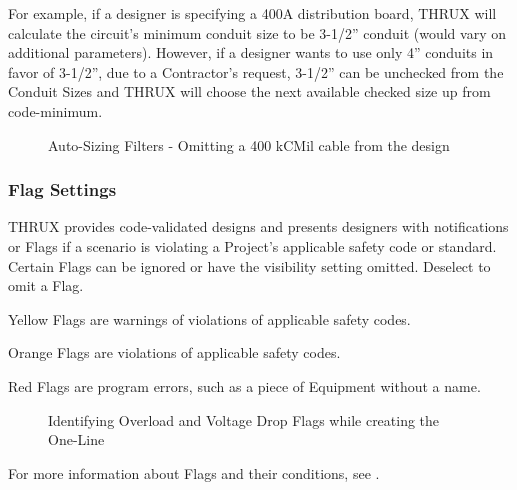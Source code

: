 \documentclass[letterpaper,10pt,english]{sphinxmanual}
\begin{document}
For example, if a designer is specifying a 400A distribution board, THRUX will calculate the circuit’s minimum conduit size to be 3-1/2” conduit (would vary on additional parameters).  However, if a designer wants to use only 4” conduits in favor of 3-1/2”, due to a Contractor’s request, 3-1/2” can be unchecked from the Conduit Sizes and THRUX will choose the next available checked size up from code-minimum.

\begin{figure}[H]
\centering
\capstart

\noindent{}
\caption{Auto-Sizing Filters - Omitting a 400 kCMil cable from the design}\label{\detokenize{docs/userguide/projectsettings/autosizingfilters/index-auto_sizing_filters:id2}}\end{figure}


\subsubsection{Flag Settings}
\label{\detokenize{docs/userguide/projectsettings/flagsettings/index-flag_settings:flag-settings}}\label{\detokenize{docs/userguide/projectsettings/flagsettings/index-flag_settings:id1}}\label{\detokenize{docs/userguide/projectsettings/flagsettings/index-flag_settings::doc}}
THRUX provides code-validated designs and presents designers with notifications or Flags if a scenario is violating a Project’s applicable safety code or standard.  Certain Flags can be ignored or have the visibility setting omitted.  Deselect to omit a Flag.

Yellow Flags are warnings of violations of applicable safety codes.

Orange Flags are violations of applicable safety codes.

Red Flags are program errors, such as a piece of Equipment without a name.

\begin{figure}[H]
\centering
\capstart

\noindent{}
\caption{Identifying Overload and Voltage Drop Flags while creating the One-Line}\label{\detokenize{docs/userguide/projectsettings/flagsettings/index-flag_settings:id2}}\end{figure}

For more information about Flags and their conditions, see {\hyperref[\detokenize{docs/definitions/index-definitions:flag-settings-definitions}]{}}.
\end{document}
